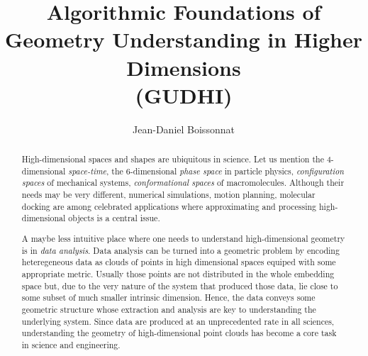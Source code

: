 \documentclass[a4paper, 11pt]{article}
\begin{document}
\title{Algorithmic Foundations of \\%
Geometry Understanding in Higher Dimensions\\ (GUDHI)}
\author{Jean-Daniel Boissonnat}

\maketitle

\begin{abstract}

High-dimensional spaces and shapes
are ubiquitous in science.  Let us mention the  4-dimensional {\em space-time},  the 6-dimensional {\em phase space} in particle physics, {\em configuration spaces} of mechanical systems, {\em conformational spaces} of macromolecules.  Although their needs may be very different, numerical simulations, motion planning, molecular docking are among celebrated applications where approximating and processing high-dimensional objects is a central issue. 

A maybe less intuitive place where one needs to understand  high-dimensional geometry is in {\em data analysis}.  Data analysis can be turned into a geometric problem by encoding heteregeneous data as clouds of points in high dimensional spaces equiped with some appropriate metric. Usually those points are not distributed in the whole embedding space but, due to the very nature of the system that produced those data, lie close to some subset of much smaller intrinsic dimension. Hence, the data conveys some geometric structure whose extraction and analysis are key to understanding the underlying system.
Since data are produced at an unprecedented rate in all sciences, 
understanding the geometry of high-dimensional point clouds has become a core task in science and engineering. 


\end{abstract}
\end{document}
